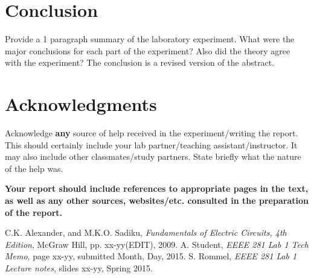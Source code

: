 \documentclass[11pt]{article}
\begin{document}
	\section{Conclusion}
	Provide a 1 paragraph summary of the laboratory experiment.  What were the major conclusions for each part of the experiment?  Also did the theory agree with the experiment?  The conclusion is a revised version of the abstract.
	
	\section{Acknowledgments}
	Acknowledge \textbf{any} source of help received in the experiment/writing the report.  This should certainly include your lab partner/teaching assistant/instructor.  It may also include other classmates/study partners. State briefly what the nature of the help was.
	
	\textbf{Your report should include references to appropriate pages in the text, as well as any other sources, websites/etc. consulted in the preparation of the report.}
\begin{thebibliography}{9}
	C.K. Alexander, and M.K.O. Sadiku,
	\emph{Fundamentals of Electric Circuits, 4th Edition},
	McGraw Hill, pp. xx-yy(EDIT), 2009.
A. Student,
	\emph{EEEE 281 Lab 1 Tech Memo},
	page xx-yy, submitted Month, Day, 2015.
	S. Rommel,
	\emph{EEEE 281 Lab 1 Lecture notes},
	slides xx-yy, Spring 2015.
\end{thebibliography}
\end{document}
